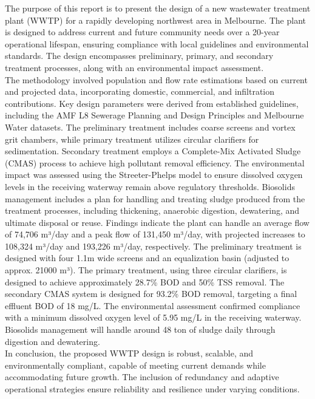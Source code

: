 \documentclass[11pt]{article}
\begin{document}
The purpose of this report is to present the design 
of a new wastewater treatment plant (WWTP) 
for a rapidly developing northwest area in Melbourne. 
The plant is designed to address current and future 
community needs over a 20-year operational lifespan, 
ensuring compliance with local guidelines and environmental 
standards. The design encompasses preliminary, primary, 
and secondary treatment processes, along with an environmental 
impact assessment.\\
The methodology involved population and flow rate 
estimations based on current and projected data, 
incorporating domestic, commercial, and infiltration 
contributions. Key design parameters were derived 
from established guidelines, including the AMF L8 
Sewerage Planning and Design Principles and Melbourne 
Water datasets. The preliminary treatment includes 
coarse screens and vortex grit chambers, while primary 
treatment utilizes circular clarifiers for sedimentation. 
Secondary treatment employs a Complete-Mix Activated 
Sludge (CMAS) process to achieve high pollutant removal 
efficiency. The environmental impact was assessed 
using the Streeter-Phelps model to ensure dissolved
 oxygen levels in the receiving waterway remain above 
 regulatory thresholds. Biosolids management includes 
 a plan for handling and treating sludge produced 
 from the treatment processes, including thickening, 
 anaerobic digestion, dewatering, and ultimate 
 disposal or reuse. 
Findings indicate the plant can handle an average 
flow of 74,706 m³/day and a peak flow of 131,450 m³/day, 
with projected increases to 108,324 m³/day and 193,226 m³/day, 
respectively. The preliminary treatment is designed with 
four 1.1m wide screens and an equalization basin 
(adjusted to approx. 21000 m³). The primary treatment, 
using three circular clarifiers, is designed to achieve 
approximately 28.7\% BOD and 50\% TSS removal. 
The secondary CMAS system is designed for 93.2\% 
BOD removal, targeting a final effluent BOD of 18 mg/L. 
The environmental assessment confirmed compliance with 
a minimum dissolved oxygen level of 5.95 mg/L in the 
receiving waterway. Biosolids management will handle 
around 48 ton of sludge daily through digestion and 
dewatering. \\
In conclusion, the proposed WWTP design is robust, 
scalable, and environmentally compliant, capable of 
meeting current demands while accommodating future growth. 
The inclusion of redundancy and adaptive operational 
strategies ensure reliability and resilience under varying 
conditions.
\newpage
\end{document}
